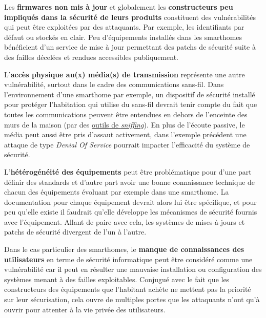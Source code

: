 \documentclass[]{article}
\begin{document}
\par Les \textbf{firmwares non mis à jour} et globalement les \textbf{constructeurs peu impliqués dans la sécurité de leurs produits} constituent des vulnérabilités qui peut être exploitées par des attaquants. Par exemple, les identifiants par défaut ou stockés en clair. Peu d'équipements installés dans les smarthomes bénéficient d'un service de mise à jour permettant des patchs de sécurité \cite{Huichen2016} suite à des failles décelées et rendues accessibles publiquement.\\

\par L'\textbf{accès physique au(x) média(s) de transmission} représente une autre vulnérabilité, surtout dans le cadre des communications sans-fil. Dans l'environnement d'une smarthome par exemple, un dispositif de sécurité installé pour protéger l'habitation qui utilise du sans-fil devrait tenir compte du fait que toutes les communications peuvent être entendues en dehors de l'enceinte des murs de la maison (par des \href{https://www.ittsystems.com/packet-sniffing-tools/}{outils de \textit{sniffing}}). En plus de l'écoute passive, le média peut aussi être pris d'assaut activement, dans l'exemple précédent une attaque de type \textit{Denial Of Service} pourrait impacter l'efficacité du système de sécurité.\\

\par L'\textbf{hétérogénéité des équipements} peut être problématique pour d'une part définir des standards et d'autre part avoir une bonne connaissance technique de chacun des équipements évoluant par exemple dans une smarthome. La documentation pour chaque équipement devrait alors lui être spécifique, et pour peu qu'elle existe il faudrait qu'elle développe les mécanismes de sécurité fournis avec l'équipement. Allant de paire avec cela, les systèmes de mises-à-jours et patchs de sécurité divergent de l'un à l'autre.\\

\par Dans le cas particulier des smarthomes, le \textbf{manque de connaissances des utilisateurs} en terme de sécurité informatique \cite{Nthala2018} peut être considéré comme une vulnérabilité car il peut en résulter une mauvaise installation ou configuration des systèmes menant à des failles exploitables. Conjugué avec le fait que les constructeurs des équipements que l'habitant achète ne mettent pas la priorité sur leur sécurisation, cela ouvre de multiples portes que les attaquants n'ont qu'à ouvrir pour attenter à la vie privée des utilisateurs.
\end{document}
